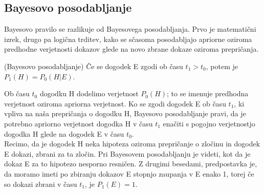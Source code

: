 \documentclass[fin1, tisk]{fmfdelo}
\theoremstyle{definition}
\theoremstyle{trditev}
\theoremstyle{izrek}
\begin{document}
\subsection{Bayesovo posodabljanje}
Bayesovo pravilo se razlikuje od Bayesovega posodabljanja. Prvo je matematični izrek, drugo pa logična trditev, kako se sčasoma posodabljajo
apriorne oziroma predhodne verjetnosti dokazov glede na novo zbrane dokaze oziroma prepričanja.
\begin{definicija}
    (Bayesovo posodabljanje)
    Če se dogodek E zgodi ob času $t_1 > t_0$, potem je $P_1(H) = P_0(H \lvert E)$.
\end{definicija}
Ob času $t_0$ dogodku H dodelimo verjetnost $P_0(H)$; to se imenuje predhodna verjetnost oziroma apriorna verjetnost. Ko se zgodi dogodek E
ob času $t_1$, ki vpliva na naša prepričanja o dogodku H, Bayesovo posodabljanje pravi, da je potrebno apriorno verjetnost dogodka H v času $t_1$
enačiti s pogojno verjetnostjo dogodka H glede na dogodek E v času $t_0$. \\
Recimo, da je dogodek H neka hipoteza oziroma prepričanje o zločinu in dogodek E dokazi, zbrani za ta zločin. Pri Bayesovem posodabljanju je videti,
kot da je dokaz E za to hipotezo nesporno resničen. Z drugimi besedami, predpostavka je, da moramo imeti po zbiranju dokazov E stopnjo zaupanja v E enako 1,
torej če so dokazi zbrani v času $t_1$, je $P_1(E)=1$.

\end{document}
